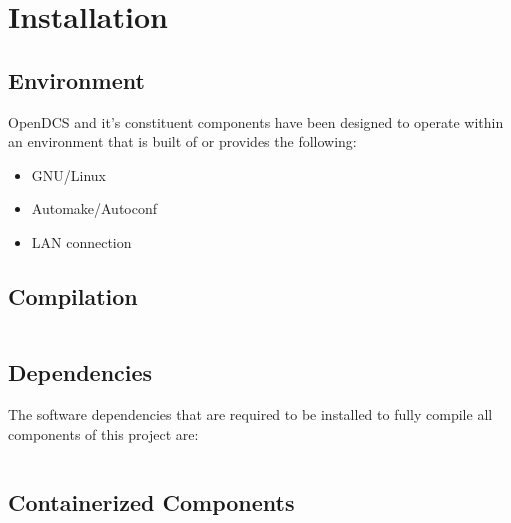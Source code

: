 \section{Installation}\label{sec:inst}

  \subsection{Environment}\label{sec:inst-env}

    OpenDCS and it's constituent components have been designed to operate
    within an environment that is built of or provides the following:

    \begin{itemize}
      \item GNU/Linux
      \item Automake/Autoconf
      \item LAN connection
    \end{itemize}

  \subsection{Compilation}\label{sec:inst-comp}

    \begin{lstlisting}[caption={},label={}]
    \end{lstlisting}

  \subsection{Dependencies}\label{sec:inst-dep}

    The software dependencies that are required to be installed to fully
    compile all components of this project are:

    \begin{itemize}
    \end{itemize}

    \begin{lstlisting}[caption={},label={}]
    \end{lstlisting}

  \subsection{Containerized Components}\label{sec:inst-cont}

    \begin{lstlisting}[caption={},label={}]
    \end{lstlisting}
